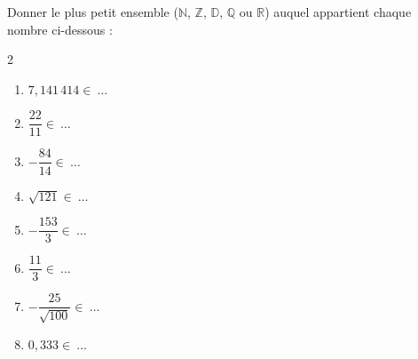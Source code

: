 \begin{exo}{}
	Donner le plus petit ensemble ($\mathbb{N}$, $\mathbb{Z}$, $\mathbb{D}$, $\mathbb{Q}$ ou $\mathbb{R}$) auquel appartient chaque nombre ci-dessous :
	\begin{multicols}{2}
	\begin{enumerate}[label=\alph*), itemsep=6pt]
		\item $7,141\,414 \in \ \dots$
		\item $\dfrac{22}{11} \in \ \dots$
		\item $-\dfrac{84}{14} \in \ \dots$
		\item $\sqrt{121} \in \ \dots$
		\item $-\dfrac{153}{3} \in \ \dots$
		\item $\dfrac{11}{3} \in \ \dots$
		\item $-\dfrac{25}{\sqrt{100}} \in \ \dots$
		\item $0,333 \in \ \dots$
	\end{enumerate}
	\end{multicols}
\end{exo}
